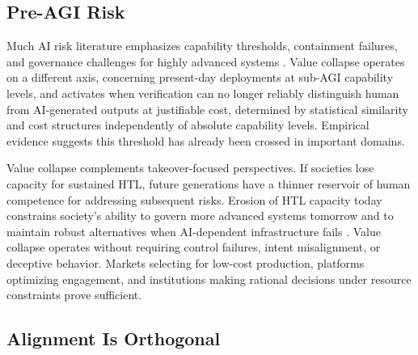 \documentclass{article}
\theoremstyle{plain}
\theoremstyle{definition}
\theoremstyle{remark}
\begin{document}
\vspace{2pt}

\subsection{Pre-AGI Risk}
\label{sec:agi}

Much AI risk literature emphasizes capability thresholds, containment failures, and governance challenges for highly advanced systems \citep{Bostrom2014-BOSS, Tegmark2017-TEGLBW, russell2019human, hendrycks2025definitionagi, slattery2025airiskrepositorycomprehensive, doi:10.1126/science.adn0117}. Value collapse operates on a different axis, concerning present-day deployments at sub-AGI capability levels, and activates when verification can no longer reliably distinguish human from AI-generated outputs at justifiable cost, determined by statistical similarity and cost structures independently of absolute capability levels. Empirical evidence suggests this threshold has already been crossed in important domains.

Value collapse complements takeover-focused perspectives. If societies lose capacity for sustained HTL, future generations have a thinner reservoir of human competence for addressing subsequent risks. Erosion of HTL capacity today constrains society's ability to govern more advanced systems tomorrow and to maintain robust alternatives when AI-dependent infrastructure fails \citep{kulveit2025gradualdisempowermentsystemicexistential}. Value collapse operates without requiring control failures, intent misalignment, or deceptive behavior. Markets selecting for low-cost production, platforms optimizing engagement, and institutions making rational decisions under resource constraints prove sufficient.

\vspace{2pt}

\subsection{Alignment Is Orthogonal}
\label{sec:alignment}
\end{document}
